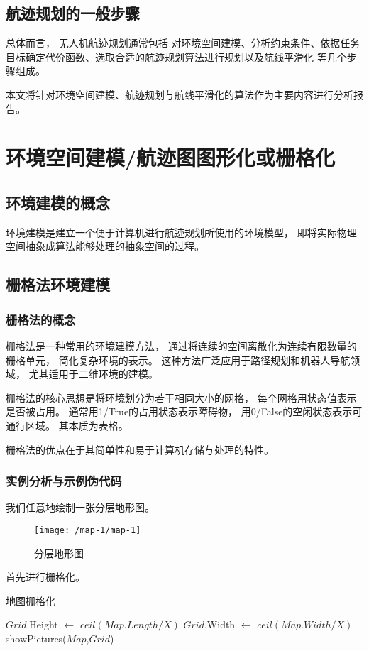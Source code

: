 \documentclass[12pt,a4paper,oneside,UTF8]{ctexart}
\begin{document}
\subsection{航迹规划的一般步骤}
总体而言，
无人机航迹规划通常包括
对环境空间建模、分析约束条件、依据任务目标确定代价函数、选取合适的航迹规划算法进行规划以及航线平滑化
等几个步骤组成。\cite{ref3}

本文将针对环境空间建模、航迹规划与航线平滑化的算法作为主要内容进行分析报告。
\newpage\section{环境空间建模/航迹图图形化或栅格化}
\subsection{环境建模的概念}
环境建模是建立一个便于计算机进行航迹规划所使用的环境模型，
即将实际物理空间抽象成算法能够处理的抽象空间的过程。
\subsection{栅格法环境建模}
\subsubsection{栅格法的概念}
栅格法是一种常用的环境建模方法，
通过将连续的空间离散化为连续有限数量的栅格单元，
简化复杂环境的表示。
这种方法广泛应用于路径规划和机器人导航领域，
尤其适用于二维环境的建模。

栅格法的核心思想是将环境划分为若干相同大小的网格，
每个网格用状态值表示是否被占用。
通常用1/True的占用状态表示障碍物，
用0/False的空闲状态表示可通行区域。
其本质为表格。

栅格法的优点在于其简单性和易于计算机存储与处理的特性。
\subsubsection{实例分析与示例伪代码}
我们任意地绘制一张分层地形图。

\begin{figure}[H]
  \centering
  \texttt{[image: /map-1/map-1]}
  \caption{分层地形图}
  \label{fig:map-1}
\end{figure}

首先进行栅格化。

\begin{algorithm}[H]
  \caption{地图栅格化}\label{algorithm-grid}

  $Grid$.Height $\leftarrow$ $ceil(Map.Length/X)$\;
  $Grid$.Width $\leftarrow$ $ceil(Map.Width/X)$\;
  showPictures($Map$,$Grid$)\;
\end{algorithm}
\end{document}
